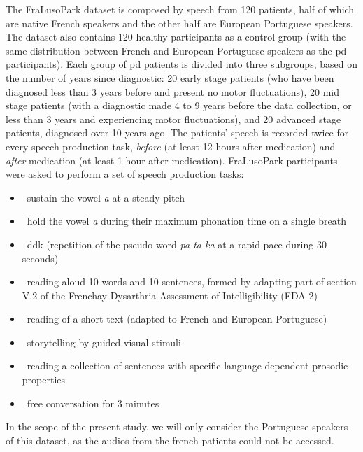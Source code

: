 The FraLusoPark dataset is composed by speech from 120 patients, half of which are native French speakers and the other half are European Portuguese speakers. The dataset also contains 120 healthy participants as a control group (with the same distribution between French and European Portuguese speakers as the \gls{pd} participants). Each group of \gls{pd} patients is divided into three subgroups, based on the number of years since diagnostic: 20 early stage patients (who have been diagnosed less than 3 years before and present no motor fluctuations), 20 mid stage patients (with a diagnostic made 4 to 9 years  before the data collection, or less than 3 years and experiencing motor fluctuations), and 20 advanced stage patients, diagnosed over 10 years ago. The patients' speech is recorded twice for every speech production task, \textit{before} (at least 12 hours after medication) and \textit{after} medication (at least 1 hour after medication). FraLusoPark participants were asked to perform a set of speech production tasks:

\begin{itemize}
	\item ~sustain the vowel \textit{\/a\/} at a steady pitch
	\item ~hold the vowel \textit{\/a\/} during their maximum phonation time on a single breath
	\item ~\gls{ddk} (repetition of the pseudo-word \textit{\/pa-ta-ka\/} at a rapid pace during 30 seconds)
	\item ~reading aloud 10 words and 10 sentences, formed by adapting part of section V.2 of the Frenchay Dysarthria Assessment of Intelligibility (FDA-2)
	\item ~reading of a short text (adapted to French and European Portuguese)
	\item ~storytelling by guided visual stimuli
	\item ~reading a collection of sentences with specific language-dependent prosodic properties
	\item ~free conversation for 3 minutes
	
\end{itemize}

In the scope of the present study, we will only consider the Portuguese speakers of this dataset, as the audios from the french patients could not be accessed.

